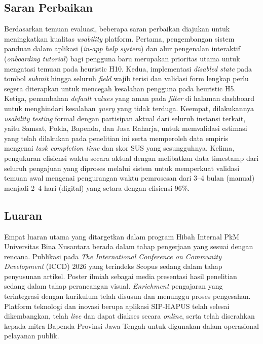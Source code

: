 \documentclass[conference]{IEEEtran}
\begin{document}
\subsection{Saran Perbaikan}
\label{subsec:saran}

Berdasarkan temuan evaluasi, beberapa saran perbaikan diajukan untuk meningkatkan kualitas
\emph{usability} platform. Pertama, pengembangan sistem panduan dalam aplikasi (\emph{in-app
help system}) dan alur pengenalan interaktif (\emph{onboarding tutorial}) bagi pengguna
baru merupakan prioritas utama untuk mengatasi temuan pada heuristic H10. Kedua,
implementasi \emph{disabled state} pada tombol \emph{submit} hingga seluruh \emph{field}
wajib terisi dan validasi form lengkap perlu segera diterapkan untuk mencegah kesalahan
pengguna pada heuristic H5. Ketiga, penambahan \emph{default values} yang aman pada
\emph{filter} di halaman dashboard untuk menghindari kesalahan \emph{query} yang tidak
terduga. Keempat, dilakukannya \emph{usability testing} formal dengan partisipan aktual
dari seluruh instansi terkait, yaitu Samsat, Polda, Bapenda, dan Jasa Raharja, untuk
memvalidasi estimasi yang telah dilakukan pada penelitian ini serta memperoleh data
empiris mengenai \emph{task completion time} dan skor SUS yang sesungguhnya. Kelima,
pengukuran efisiensi waktu secara aktual dengan melibatkan data timestamp dari seluruh
pengajuan yang diproses melalui sistem untuk memperkuat validasi temuan awal mengenai
pengurangan waktu pemrosesan dari 3--4 bulan (manual) menjadi 2--4 hari (digital) yang
setara dengan efisiensi 96\%.

\subsection{Luaran}
\label{subsec:luaran}

Empat luaran utama yang ditargetkan dalam program Hibah Internal PkM Universitas Bina
Nusantara berada dalam tahap pengerjaan yang sesuai dengan rencana. Publikasi pada
\emph{The International Conference on Community Development} (ICCD) 2026 yang terindeks
Scopus sedang dalam tahap penyusunan artikel. Poster ilmiah sebagai media presentasi
hasil penelitian sedang dalam tahap perancangan visual. \emph{Enrichment} pengajaran
yang terintegrasi dengan kurikulum telah disusun dan menunggu proses pengesahan. Platform
teknologi dan inovasi berupa aplikasi SIP-HAPUS telah selesai dikembangkan, telah \emph{live}
dan dapat diakses secara \emph{online}, serta telah diserahkan kepada mitra Bapenda
Provinsi Jawa Tengah untuk digunakan dalam operasional pelayanan publik.
\end{document}
